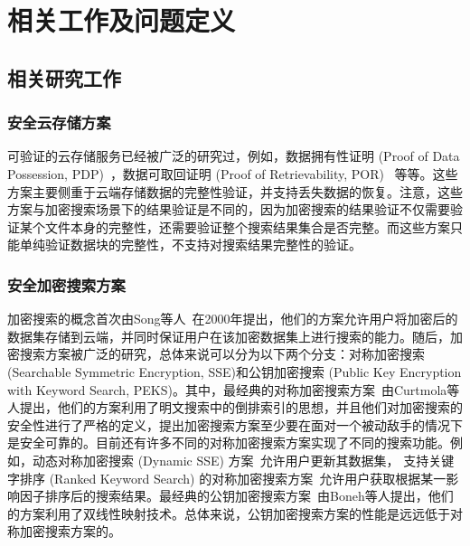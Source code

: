 \chapter{相关工作及问题定义}
\label{cha:related}

\section{相关研究工作}
\subsection{安全云存储方案}
可验证的云存储服务已经被广泛的研究过，例如，数据拥有性证明 (Proof of Data Possession, PDP)~\cite{ateniese2007provable, ateniese2008scalable, erway2015dynamic,zhu2012cooperative}，数据可取回证明 (Proof of Retrievability, POR)~\cite{juels2007pors, bowers2009proofs, stefanov2012iris} 等等。这些方案主要侧重于云端存储数据的完整性验证，并支持丢失数据的恢复。注意，这些方案与加密搜索场景下的结果验证是不同的，因为加密搜索的结果验证不仅需要验证某个文件本身的完整性，还需要验证整个搜索结果集合是否完整。而这些方案只能单纯验证数据块的完整性，不支持对搜索结果完整性的验证。

\subsection{安全加密搜索方案}
加密搜索的概念首次由Song等人~\cite{song2000practical}在2000年提出，他们的方案允许用户将加密后的数据集存储到云端，并同时保证用户在该加密数据集上进行搜索的能力。随后，加密搜索方案被广泛的研究，总体来说可以分为以下两个分支：对称加密搜索 (Searchable Symmetric Encryption, SSE)和公钥加密搜索 (Public Key Encryption with Keyword Search, PEKS)。其中，最经典的对称加密搜索方案~\cite{curtmola2011searchable}由Curtmola等人提出，他们的方案利用了明文搜索中的倒排索引的思想，并且他们对加密搜索的安全性进行了严格的定义，提出加密搜索方案至少要在面对一个被动敌手的情况下是安全可靠的。目前还有许多不同的对称加密搜索方案实现了不同的搜索功能。例如，动态对称加密搜索 (Dynamic SSE) 方案~\cite{kamara2012dynamic,cash2014dynamic,stefanov2014practical}允许用户更新其数据集， 支持关键字排序 (Ranked Keyword Search) 的对称加密搜索方案~\cite{wang2010secure}允许用户获取根据某一影响因子排序后的搜索结果。最经典的公钥加密搜索方案~\cite{boneh2004public}由Boneh等人提出，他们的方案利用了双线性映射技术。总体来说，公钥加密搜索方案的性能是远远低于对称加密搜索方案的。


